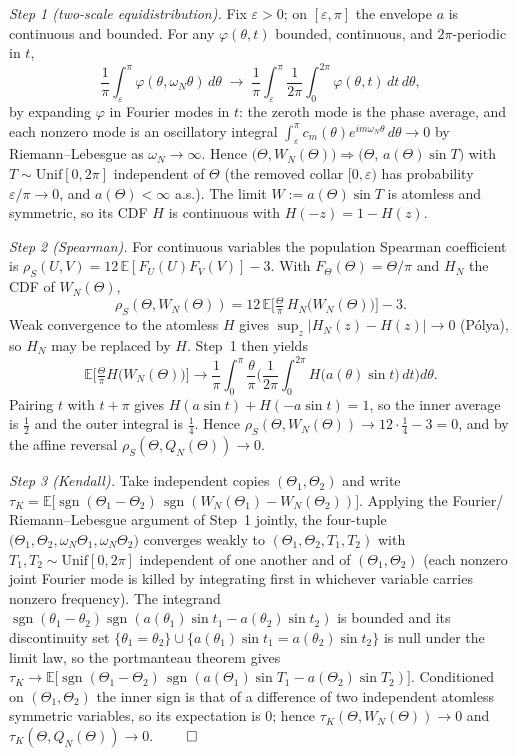 \documentclass[11pt]{article}
\theoremstyle{remark}
\begin{document}
\emph{Step 1 (two-scale equidistribution).} Fix $\varepsilon>0$; on
$[\varepsilon,\pi]$ the envelope $a$ is continuous and bounded. For any
$\varphi(\theta,t)$ bounded, continuous, and $2\pi$-periodic in $t$,
\[
\frac1\pi\int_\varepsilon^\pi \varphi(\theta,\omega_N\theta)\,d\theta
\;\longrightarrow\;
\frac1\pi\int_\varepsilon^\pi \frac1{2\pi}\int_0^{2\pi}\varphi(\theta,t)\,dt\,d\theta ,
\]
by expanding $\varphi$ in Fourier modes in $t$: the zeroth mode is the phase
average, and each nonzero mode is an oscillatory integral $\int_\varepsilon^\pi
c_m(\theta)e^{im\omega_N\theta}\,d\theta\to0$ by Riemann--Lebesgue as
$\omega_N\to\infty$. Hence $\big(\Theta,W_N(\Theta)\big)\Rightarrow
\big(\Theta,\,a(\Theta)\sin T\big)$ with $T\sim\mathrm{Unif}[0,2\pi]$ independent
of $\Theta$ (the removed collar $[0,\varepsilon)$ has probability
$\varepsilon/\pi\to0$, and $a(\Theta)<\infty$ a.s.). The limit $W:=a(\Theta)\sin T$
is atomless and symmetric, so its CDF $H$ is continuous with $H(-z)=1-H(z)$.

\emph{Step 2 (Spearman).} For continuous variables the population Spearman
coefficient is $\rho_S(U,V)=12\,\mathbb E[F_U(U)F_V(V)]-3$. With
$F_\Theta(\Theta)=\Theta/\pi$ and $H_N$ the CDF of $W_N(\Theta)$,
\[
\rho_S(\Theta,W_N(\Theta))=12\,\mathbb E\!\Big[\tfrac{\Theta}{\pi}\,H_N\big(W_N(\Theta)\big)\Big]-3 .
\]
Weak convergence to the atomless $H$ gives $\sup_z\lvert H_N(z)-H(z)\rvert\to0$
(P\'olya), so $H_N$ may be replaced by $H$. Step~1 then yields
\[
\mathbb E\!\Big[\tfrac{\Theta}{\pi}H\big(W_N(\Theta)\big)\Big]
\longrightarrow
\frac1\pi\int_0^\pi\frac{\theta}{\pi}\Big(\frac1{2\pi}\int_0^{2\pi}H\big(a(\theta)\sin t\big)\,dt\Big)d\theta .
\]
Pairing $t$ with $t+\pi$ gives $H(a\sin t)+H(-a\sin t)=1$, so the inner average is
$\tfrac12$ and the outer integral is $\tfrac14$. Hence
$\rho_S(\Theta,W_N(\Theta))\to12\cdot\tfrac14-3=0$, and by the affine reversal
$\rho_S(\Theta,Q_N(\Theta))\to0$.

\emph{Step 3 (Kendall).} Take independent copies $(\Theta_1,\Theta_2)$ and write
$\tau_K=\mathbb E\big[\operatorname{sgn}(\Theta_1-\Theta_2)\,
\operatorname{sgn}(W_N(\Theta_1)-W_N(\Theta_2))\big]$. Applying the Fourier/%
Riemann--Lebesgue argument of Step~1 jointly, the four-tuple
$\big(\Theta_1,\Theta_2,\omega_N\Theta_1,\omega_N\Theta_2\big)$ converges weakly to
$(\Theta_1,\Theta_2,T_1,T_2)$ with $T_1,T_2\sim\mathrm{Unif}[0,2\pi]$ independent of
one another and of $(\Theta_1,\Theta_2)$ (each nonzero joint Fourier mode is killed
by integrating first in whichever variable carries nonzero frequency). The
integrand $\operatorname{sgn}(\theta_1-\theta_2)\operatorname{sgn}(a(\theta_1)\sin
t_1-a(\theta_2)\sin t_2)$ is bounded and its discontinuity set
$\{\theta_1=\theta_2\}\cup\{a(\theta_1)\sin t_1=a(\theta_2)\sin t_2\}$ is null under
the limit law, so the portmanteau theorem gives
$\tau_K\to\mathbb E\big[\operatorname{sgn}(\Theta_1-\Theta_2)\,
\operatorname{sgn}(a(\Theta_1)\sin T_1-a(\Theta_2)\sin T_2)\big]$. Conditioned on
$(\Theta_1,\Theta_2)$ the inner sign is that of a difference of two independent
atomless symmetric variables, so its expectation is $0$; hence
$\tau_K(\Theta,W_N(\Theta))\to0$ and $\tau_K(\Theta,Q_N(\Theta))\to0$.
\hfill$\qed$
\end{document}

